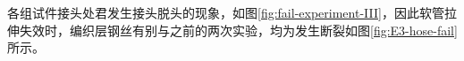各组试件接头处君发生接头脱头的现象，如图\ref{fig:fail-experiment-III}，因此软管拉伸失效时，编织层钢丝有别与之前的两次实验，均为发生断裂如图\ref{fig:E3-hose-fail}所示。

\begin{figure}[!htb]
	\centering
	\hspace{1cm}
	\subfigure{
}
\end{figure}
